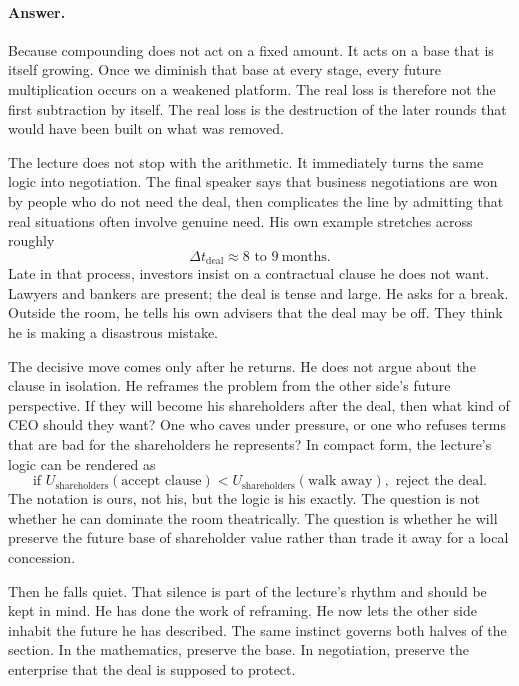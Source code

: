 \paragraph{Answer.}
Because compounding does not act on a fixed amount. It acts on a base that is itself growing. Once we diminish that base at every stage, every future multiplication occurs on a weakened platform. The real loss is therefore not the first subtraction by itself. The real loss is the destruction of the later rounds that would have been built on what was removed.

The lecture does not stop with the arithmetic. It immediately turns the same logic into negotiation. The final speaker says that business negotiations are won by people who do not need the deal, then complicates the line by admitting that real situations often involve genuine need. His own example stretches across roughly
\begin{equation}
\Delta t_{\text{deal}}\approx 8\text{ to }9\ \text{months}.
\end{equation}
Late in that process, investors insist on a contractual clause he does not want. Lawyers and bankers are present; the deal is tense and large. He asks for a break. Outside the room, he tells his own advisers that the deal may be off. They think he is making a disastrous mistake.

The decisive move comes only after he returns. He does not argue about the clause in isolation. He reframes the problem from the other side's future perspective. If they will become his shareholders after the deal, then what kind of CEO should they want? One who caves under pressure, or one who refuses terms that are bad for the shareholders he represents? In compact form, the lecture's logic can be rendered as
\begin{equation}
\text{if }U_{\text{shareholders}}(\text{accept clause})
<
U_{\text{shareholders}}(\text{walk away}),
\text{ reject the deal.}
\end{equation}
The notation is ours, not his, but the logic is his exactly. The question is not whether he can dominate the room theatrically. The question is whether he will preserve the future base of shareholder value rather than trade it away for a local concession.

Then he falls quiet. That silence is part of the lecture's rhythm and should be kept in mind. He has done the work of reframing. He now lets the other side inhabit the future he has described. The same instinct governs both halves of the section. In the mathematics, preserve the base. In negotiation, preserve the enterprise that the deal is supposed to protect.


